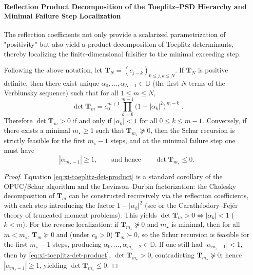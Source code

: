 \paragraph{Reflection Product Decomposition of the Toeplitz--PSD Hierarchy and Minimal Failure Step Localization}
The reflection coefficients not only provide a scalarized parametrization of "positivity" but also yield a product decomposition of Toeplitz determinants, thereby localizing the finite-dimensional falsifier to the minimal exceeding step.

\begin{theorem}\label{thm:xi-toeplitz-det-verblunsky}
Following the above notation, let \(\mathbf{T}_N=(c_{j-k})_{0\le j,k\le N}\).
If \(\mathbf{T}_N\) is positive definite, then there exist unique \(\alpha_0,\dots,\alpha_{N-1}\in\mathbb{D}\) (the first \(N\) terms of the Verblunsky sequence) such that for all \(1\le m\le N\),
\begin{equation}\label{eq:xi-toeplitz-det-product}
\boxed{\;
\det \mathbf{T}_m
=c_0^{m+1}\prod_{k=0}^{m-1}\bigl(1-|\alpha_k|^2\bigr)^{\,m-k}\; }.
\end{equation}
Therefore \(\det \mathbf{T}_m>0\) if and only if \(|\alpha_k|<1\) for all \(0\le k\le m-1\).
Conversely, if there exists a minimal \(m_\star\ge 1\) such that \(\mathbf{T}_{m_\star}\not\succeq 0\), then the Schur recursion is strictly feasible for the first \(m_\star-1\) steps, and at the minimal failure step one must have
\[
|\alpha_{m_\star-1}|\ge 1,
\qquad\text{and hence}\qquad
\det \mathbf{T}_{m_\star}\le 0.
\]
\end{theorem}

\begin{proof}
Equation \eqref{eq:xi-toeplitz-det-product} is a standard corollary of the OPUC/Schur algorithm and the Levinson--Durbin factorization: the Cholesky decomposition of \(\mathbf{T}_m\) can be constructed recursively via the reflection coefficients, with each step introducing the factor \(1-|\alpha_k|^2\) (see \cite[Ch.~1--2]{Simon2005OPUC1} or the Carath\'eodory--Fej\'er theory of truncated moment problems).
This yields \(\det \mathbf{T}_m>0 \Longleftrightarrow |\alpha_k|<1\) (\(k<m\)).
For the reverse localization: if \(\mathbf{T}_{m_\star}\not\succeq 0\) and \(m_\star\) is minimal, then for all \(m<m_\star\), \(\mathbf{T}_m\succeq 0\) and (under \(c_0>0\)) \(\mathbf{T}_m\succ 0\), so the Schur recursion is feasible for the first \(m_\star-1\) steps, producing \(\alpha_0,\dots,\alpha_{m_\star-2}\in\mathbb{D}\).
If one still had \(|\alpha_{m_\star-1}|<1\), then by \eqref{eq:xi-toeplitz-det-product}, \(\det\mathbf{T}_{m_\star}>0\), contradicting \(\mathbf{T}_{m_\star}\not\succeq 0\); hence \(|\alpha_{m_\star-1}|\ge 1\), yielding \(\det\mathbf{T}_{m_\star}\le 0\).
\end{proof}

